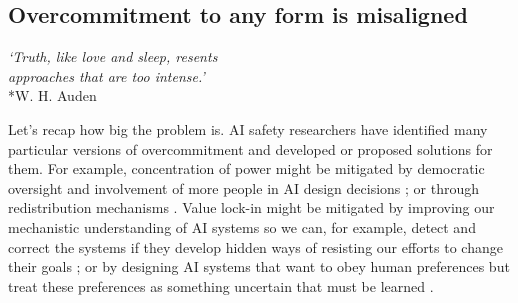 \documentclass[12pt]{article}
\begin{document}






\subsection{Overcommitment to any form is misaligned}

\begin{center}
\textit{`Truth, like love and sleep, resents\\approaches that are too intense.'}\\*W. H. Auden
\end{center}

Let's recap how big the problem is. AI safety researchers have identified many particular versions of overcommitment and developed or proposed solutions for them. For example, concentration of power might be mitigated by democratic oversight and involvement of more people in AI design decisions \citep{birhane2022power, sloane2022participation, selbst2019fairness, lazar2023ai, dafoe2018ai, openai2023democratic}; or through redistribution mechanisms \citep{okeefe2020windfall, sharp2025agentic, gough2019universal, susskind2020world}. Value lock-in might be mitigated by improving our mechanistic understanding of AI systems so we can, for example, detect and correct the systems if they develop hidden ways of resisting our efforts to change their goals \citep{olah2020zoom, burns2022discovering, bereska2024mechanistic, anthropic2024mapping}; or by designing AI systems that want to obey human preferences but treat these preferences as something uncertain that must be learned \citep{russell2019human, hadfieldmenell2017off, hadfieldmenell2016cooperative, shah2020benefits, jeon2020reward}. 
\end{document}

